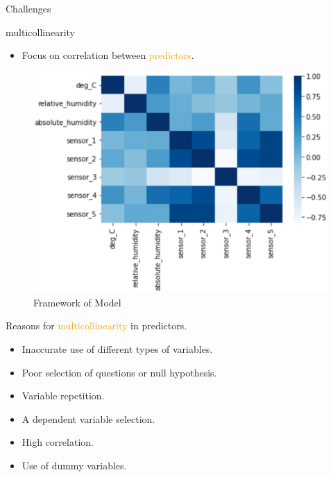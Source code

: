 \documentclass[
 size=14pt,
 paper=smartboard,  %
 mode=present, 		%
 display=slides, 	%
 style=tuliplab,  	%
 pauseslide,
 fleqn,leqno]{powerdot}
\begin{document}
\begin{slide}[toc=,bm=]{Challenges}
\twocolumn
{
multicollinearity
\begin{itemize}
\item
\smallskip
Focus on correlation between \textcolor{orange}{predictors}.

\end{itemize}
\begin{figure}
  \centering
 \includegraphics[width=1.0\linewidth,height=0.8\linewidth]{graphics//Fig_heatmap.eps}
  \caption{Framework of Model} \label{Heatmap}
\end{figure}
}
{
    
    Reasons for \textcolor{orange}{multicollinearity} in predictors.
    
    \begin{itemize}
    \item
    Inaccurate use of different types of variables.
    \item
    Poor selection of questions or null hypothesis.
    \item Variable repetition.
    \item A dependent variable selection.
    \item High correlation.
    \item Use of dummy variables.
   
    \end{itemize}
}


\end{slide}
\end{document}
